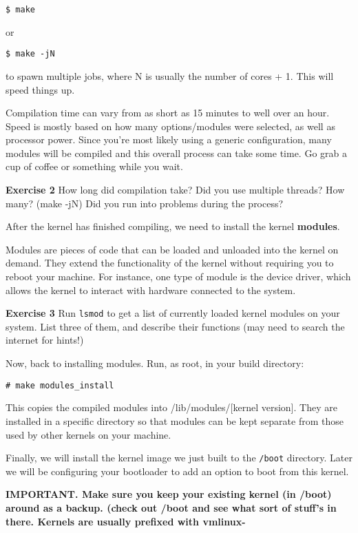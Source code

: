 \documentclass{article}
\begin{document}
\begin{verbatim}$ make\end{verbatim} 

or

\begin{verbatim}$ make -jN\end{verbatim}
to spawn multiple jobs, where N is usually the number of cores + 1. This will speed things up.

Compilation time can vary from as short as 15 minutes to well over an hour. Speed is mostly based on how many options/modules were selected, as well as processor power. Since you're most likely using a generic configuration, many modules will be compiled and this overall process can take some time. Go grab a cup of coffee or something while you wait.  


{\bf Exercise 2} How long did compilation take?  Did you use multiple threads? How many? (make -jN) Did you run into problems during the process?


After the kernel has finished compiling, we need to install the kernel {\bf modules}. 


Modules are pieces of code that can be loaded and unloaded into the kernel on demand. They extend the functionality of the kernel without requiring you to reboot your machine. For instance, one type of module is the device driver, which allows the kernel to interact with hardware connected to the system. 


{\bf Exercise 3} Run \texttt{lsmod} to get a list of currently loaded kernel modules on your system. List three of them, and describe their functions (may need to search the internet for hints!)


\pagebreak
Now, back to installing modules. Run, as root, in your build directory: 

\begin{verbatim}# make modules_install\end{verbatim}

This copies the compiled modules into /lib/modules/[kernel version]. They are installed in a specific directory so that modules can be kept separate from those used by other kernels on your machine.

Finally, we will install the kernel image we just built to the \texttt{/boot} directory. Later we will be configuring your bootloader to add an option to boot from this kernel. 


{\bf IMPORTANT. Make sure you keep your existing kernel (in /boot) around as a backup. (check out /boot and see what sort of stuff's in there. Kernels are usually prefixed with vmlinux-}
\end{document}

